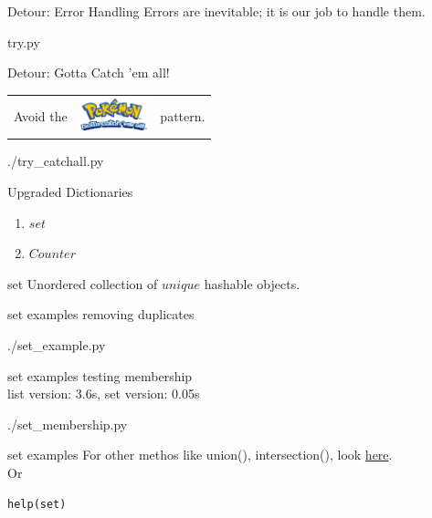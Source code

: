 \documentclass{beamer}
\begin{document}
\begin{frame}{Detour: Error Handling}
  Errors are inevitable; it is our job to handle them.
  \begin{lstinputlisting}
    {try.py}
  \end{lstinputlisting}
\end{frame}

\begin{frame}{Detour: Gotta Catch 'em all!}
  \begin{table}[h!]
    \begin{tabular}{lll}
      Avoid the & \includegraphics[height=10mm]{pokemon.jpg} & pattern.
    \end{tabular}
  \end{table}
  \begin{lstinputlisting}
    {./try_catchall.py}
  \end{lstinputlisting}
\end{frame}

\begin{frame}{Upgraded Dictionaries}
  \begin{enumerate}
    \item $set$
    \item $Counter$
  \end{enumerate}
\end{frame}

\begin{frame}{set}
  Unordered collection of $unique$ hashable objects.\\
\end{frame}

\begin{frame}{set examples}
  removing duplicates
  \begin{lstinputlisting}
    {./set_example.py}
  \end{lstinputlisting}
\end{frame}

\begin{frame}{set examples}
  testing membership\\
  list version: 3.6s, set version: 0.05s
  \begin{lstinputlisting}
    {./set_membership.py}
  \end{lstinputlisting}
\end{frame}

\begin{frame}[fragile]{set examples}
  For other methos like union(), intersection(), look
  \href{https://docs.python.org/3.7/library/stdtypes.html\#set}{here}.\\
  Or
  \begin{lstlisting}
help(set)
  \end{lstlisting}
\end{frame}
\end{document}
